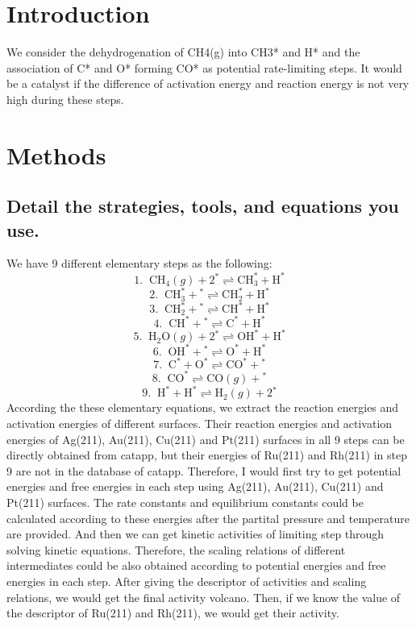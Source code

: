 \documentclass{article}
\begin{document}
\newpage
\section{Introduction}
    We consider the dehydrogenation of CH4(g) into CH3* and H* and the association of C* and O* forming CO* as potential rate-limiting steps. It would be a catalyst if the difference of activation energy and reaction energy is not very high during these steps.

 
\section{Methods}
    \subsection*{Detail the strategies, tools, and equations you use.}
    We have 9 different elementary steps as the following: \\
    $$ 1.\;\; \text{CH}_4(g)+2\text{}^* \rightleftharpoons \text{CH}_3^* + \text{H}^* $$
    $$ 2.\;\;  \text{CH}_3^*+ \text{}^* \rightleftharpoons \text{CH}_2^* + \text{H}^* $$
    $$ 3.\;\;  \text{CH}_2^*+ \text{}^* \rightleftharpoons \text{CH}^* + \text{H}^* $$
    $$ 4.\;\; \text{CH}^*+ \text{}^* \rightleftharpoons \text{C}^* + \text{H}^* $$
    $$ 5.\;\;  \text{H}_2\text{O}(g)+2\text{}^* \rightleftharpoons \text{OH}^* + \text{H}^* $$
    $$ 6.\;\; \text{OH}^*+\text{}^* \rightleftharpoons \text{O}^* + \text{H}^* $$
    $$ 7.\;\; \text{C}^*+ \text{O}^* \rightleftharpoons \text{CO}^* + \text{}^* $$
    $$ 8.\;\; \text{CO}^* \rightleftharpoons \text{CO}(g) + \text{}^* $$
    $$ 9.\;\; \text{H}^*+\text{H}^* \rightleftharpoons \text{H}_2(g) + 2\text{}^* $$
    According the these elementary equations, we extract the reaction energies and activation energies of different surfaces. Their reaction energies and activation energies of Ag(211), Au(211), Cu(211) and Pt(211) surfaces in all 9 steps can be directly obtained from catapp, but their energies of Ru(211) and Rh(211) in step 9 are not in the database of catapp. Therefore, I would first try to get potential energies and free energies in each step using Ag(211), Au(211), Cu(211) and Pt(211) surfaces. The rate constants and equilibrium constants could be calculated according to these energies after the partital pressure and temperature are provided. And then we can get kinetic activities of limiting step through solving kinetic equations. Therefore, the scaling relations of different intermediates could be also obtained according to potential energies and free energies in each step. After giving the descriptor of activities and scaling relations, we would get the final activity volcano. Then, if we know the value of the descriptor of Ru(211) and Rh(211), we would get their activity. 
    
\end{document}
